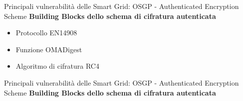 
\begin{frame}{Principali vulnerabilità delle Smart Grid: OSGP - Authenticated Encryption Scheme}
	\textbf{Building Blocks dello schema di cifratura autenticata}
	\begin{itemize}
		\item Protocollo EN14908
		\item Funzione OMADigest
		\item Algoritmo di cifratura RC4
	\end{itemize}
\end{frame}

\begin{frame}{Principali vulnerabilità delle Smart Grid: OSGP - Authenticated Encryption Scheme}
	\textbf{Building Blocks dello schema di cifratura autenticata}
\end{frame}

